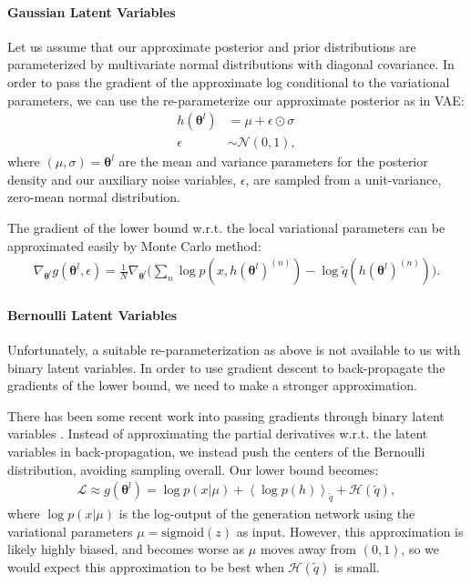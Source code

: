 \documentclass{article} %
\newcommand{\qexp}[1]{\left<#1\right>}
\newcommand{\vects}[1]{\boldsymbol{#1}}
\newcommand{\TT}[0]{\vects{\theta}}
\newcommand{\grad}[0]{\nabla}
\newcommand{\LL}[0]{\mathcal{L}}
\newcommand{\HH}[0]{\mathcal{H}}
\newcommand{\NN}[0]{\mathcal{N}}
\newcommand{\sigmoid}{\text{sigmoid}}
\begin{document}
\paragraph{Gaussian Latent Variables}

Let us assume that our approximate posterior and prior distributions are
parameterized by multivariate normal distributions with diagonal covariance. In
order to pass the gradient of the approximate log conditional to the variational
parameters, we can use the re-parameterize our approximate posterior as in VAE:
\begin{align}
h(\TT^l) &= \mu + \epsilon \odot \sigma \nonumber \\
\epsilon &\sim \NN(0, 1),
\end{align}
where $(\mu, \sigma) = \TT^l$ are the mean and variance parameters for the
posterior density and our auxiliary noise variables, $\epsilon$, are sampled
from a unit-variance, zero-mean normal distribution.

The gradient of the lower bound w.r.t. the local variational parameters can be
approximated easily by Monte Carlo method:
\begin{align}
\grad_{\TT^l} g(\TT^l, \epsilon) = \frac{1}{N} \grad_{\TT^l} \bigg(\sum_n \log p(x, h(\TT^l)^{(n)}) - \log \tilde{q}(h(\TT^l)^{(n)})\bigg).
\end{align}

\paragraph{Bernoulli Latent Variables}
Unfortunately, a suitable re-parameterization as above is not available to us
with binary latent variables. In order to use gradient descent to back-propagate
the gradients of the lower bound, we need to make a stronger approximation. 

There has been some recent work into passing gradients through binary latent
variables \citep{bengio2013estimating}. Instead of approximating the partial
derivatives w.r.t. the latent variables in back-propagation, we instead push the
centers of the Bernoulli distribution, avoiding sampling overall. Our lower
bound becomes:
\begin{align}
     \LL \approx g(\TT^l) = \log p(x | \mu) + \qexp{\log p(h)}_{\tilde{q}} +
     \HH(\tilde{q}),
\end{align}
where $\log p(x | \mu)$ is the log-output of the generation network using the
variational parameters $\mu = \sigmoid(z)$ as input. However, this approximation
is likely highly biased, and becomes worse as $\mu$ moves away from $(0, 1)$, so
we would expect this approximation to be best when $\HH(\tilde{q})$ is small.
\end{document}

